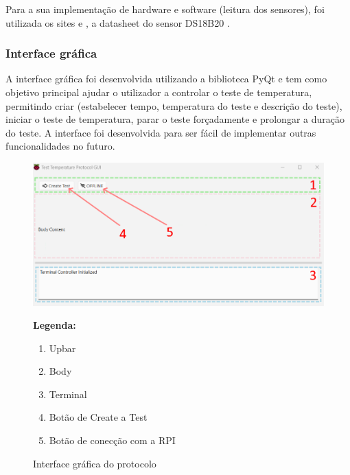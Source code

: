 Para a sua implementação de hardware e software (leitura dos sensores), foi utilizada os sites 
\cite{Brian_Mark_Benoit_Santos_Alessandro_2023} e \cite{Campbell_2025}, a datasheet do sensor DS18B20 \cite{ds_datasheet}.



\subsubsection{Interface gráfica}

A interface gráfica foi desenvolvida utilizando a biblioteca PyQt e tem como objetivo principal
ajudar o utilizador a controlar o teste de temperatura, permitindo criar (estabelecer tempo, temperatura
do teste e descrição do teste), iniciar o teste de temperatura, parar o teste forçadamente e prolongar 
a duração do teste. A interface foi desenvolvida para ser fácil de implementar outras funcionalidades
no futuro.

\begin{figure}[H]
    \centering
    \begin{minipage}{0.6\textwidth}
        \includegraphics[width=\linewidth]{figures/gui_1.png}
    \end{minipage}%
    \hfill
    \begin{minipage}{0.35\textwidth}
        \small
        \textbf{Legenda:}
        \begin{enumerate}
            \item Upbar
            \item Body
            \item Terminal
            \item Botão de Create a Test
            \item Botão de conecção com a RPI
        \end{enumerate}
    \end{minipage}
    \caption{Interface gráfica do protocolo}
    \label{fig:gui_1}
\end{figure}

